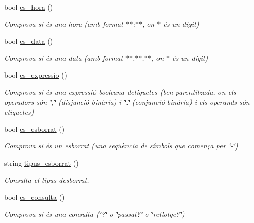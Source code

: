 \begin{DoxyCompactItemize}
bool \hyperlink{class_token_a16aead065c986f34b51c6193bd42882c}{es\+\_\+hora} ()
\begin{DoxyCompactList}\small\item\em Comprova si és una hora (amb format $\ast$$\ast$\+:$\ast$$\ast$, on $\ast$ és un dígit) \end{DoxyCompactList}\item 
bool \hyperlink{class_token_a8791d9d6123190213f63ad1026ca05be}{es\+\_\+data} ()
\begin{DoxyCompactList}\small\item\em Comprova si és una data (amb format $\ast$$\ast$.$\ast$$\ast$.$\ast$$\ast$, on $\ast$ és un dígit) \end{DoxyCompactList}\item 
bool \hyperlink{class_token_a09eb1782d5b5d9d4a2a92f33c950bfc1}{es\+\_\+expressio} ()
\begin{DoxyCompactList}\small\item\em Comprova si és una expressió booleana d\textquotesingle{}etiquetes (ben parentitzada, on els operadors són \char`\"{},\char`\"{} (disjunció binària) i \char`\"{}.\char`\"{} (conjunció binària) i els operands són etiquetes) \end{DoxyCompactList}\item 
bool \hyperlink{class_token_ab49eee0e53697bbbbbcbf0c105b3cf77}{es\+\_\+esborrat} ()
\begin{DoxyCompactList}\small\item\em Comprova si és un esborrat (una seqüència de símbols que comença per \char`\"{}-\/\char`\"{}) \end{DoxyCompactList}\item 
string \hyperlink{class_token_a12c961c772aa760b719dc3becb523ac4}{tipus\+\_\+esborrat} ()
\begin{DoxyCompactList}\small\item\em Consulta el tipus d\textquotesingle{}esborrat. \end{DoxyCompactList}\item 
bool \hyperlink{class_token_a81c4eba71c6257da6cadfab43cb237da}{es\+\_\+consulta} ()
\begin{DoxyCompactList}\small\item\em Comprova si és una consulta (\char`\"{}?\char`\"{} o \char`\"{}passat?\char`\"{} o \char`\"{}rellotge?\char`\"{}) \end{DoxyCompactList}\end{DoxyCompactItemize}
